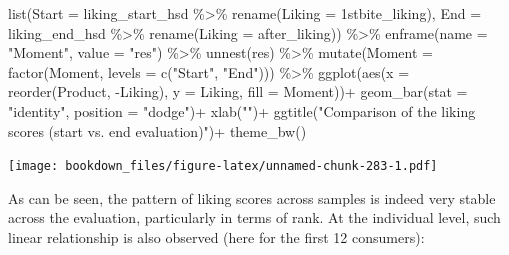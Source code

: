 \documentclass[
]{krantz}
\makeatletter
\newenvironment{Shaded}{\begin{snugshade}}{\end{snugshade}}
\newcommand{\AttributeTok}[1]{\textcolor[rgb]{0.61,0.61,0.61}{#1}}
\newcommand{\FunctionTok}[1]{\textcolor[rgb]{0,0,0}{#1}}
\newcommand{\NormalTok}[1]{#1}
\newcommand{\SpecialCharTok}[1]{\textcolor[rgb]{0,0,0}{#1}}
\newcommand{\StringTok}[1]{\textcolor[rgb]{0.5,0.5,0.5}{#1}}
\newenvironment{kframe}{%
\medskip{}
\setlength{\fboxsep}{.8em}
 \def\at@end@of@kframe{}%
 \ifinner\ifhmode%
  \def\at@end@of@kframe{\end{minipage}}%
  \begin{minipage}{\columnwidth}%
 \fi\fi%
 \def\FrameCommand##1{\hskip\@totalleftmargin \hskip-\fboxsep
 \colorbox{shadecolor}{##1}\hskip-\fboxsep
     \hskip-\linewidth \hskip-\@totalleftmargin \hskip\columnwidth}%
 \MakeFramed {\advance\hsize-\width
   \@totalleftmargin\z@ \linewidth\hsize
   \@setminipage}}%
 {\par\unskip\endMakeFramed%
 \at@end@of@kframe}
\renewenvironment{Shaded}{\begin{kframe}}{\end{kframe}}
\makeatother
\begin{document}
\begin{Shaded}
\begin{Highlighting}[]
\FunctionTok{list}\NormalTok{(}\AttributeTok{Start =}\NormalTok{ liking\_start\_hsd }\SpecialCharTok{\%\textgreater{}\%} \FunctionTok{rename}\NormalTok{(}\AttributeTok{Liking =} \StringTok{\textasciigrave{}}\AttributeTok{1stbite\_liking}\StringTok{\textasciigrave{}}\NormalTok{),}
     \AttributeTok{End =}\NormalTok{ liking\_end\_hsd }\SpecialCharTok{\%\textgreater{}\%} \FunctionTok{rename}\NormalTok{(}\AttributeTok{Liking =} \StringTok{\textasciigrave{}}\AttributeTok{after\_liking}\StringTok{\textasciigrave{}}\NormalTok{)) }\SpecialCharTok{\%\textgreater{}\%}
  \FunctionTok{enframe}\NormalTok{(}\AttributeTok{name =} \StringTok{"Moment"}\NormalTok{, }\AttributeTok{value =} \StringTok{"res"}\NormalTok{) }\SpecialCharTok{\%\textgreater{}\%}
  \FunctionTok{unnest}\NormalTok{(res) }\SpecialCharTok{\%\textgreater{}\%}
  \FunctionTok{mutate}\NormalTok{(}\AttributeTok{Moment =} \FunctionTok{factor}\NormalTok{(Moment, }\AttributeTok{levels =} \FunctionTok{c}\NormalTok{(}\StringTok{"Start"}\NormalTok{, }\StringTok{"End"}\NormalTok{))) }\SpecialCharTok{\%\textgreater{}\%}
  \FunctionTok{ggplot}\NormalTok{(}\FunctionTok{aes}\NormalTok{(}\AttributeTok{x =} \FunctionTok{reorder}\NormalTok{(Product, }\SpecialCharTok{{-}}\NormalTok{Liking), }\AttributeTok{y =}\NormalTok{ Liking, }\AttributeTok{fill =}\NormalTok{ Moment))}\SpecialCharTok{+}
  \FunctionTok{geom\_bar}\NormalTok{(}\AttributeTok{stat =} \StringTok{"identity"}\NormalTok{, }\AttributeTok{position =} \StringTok{"dodge"}\NormalTok{)}\SpecialCharTok{+}
  \FunctionTok{xlab}\NormalTok{(}\StringTok{""}\NormalTok{)}\SpecialCharTok{+}
  \FunctionTok{ggtitle}\NormalTok{(}\StringTok{"Comparison of the liking scores (start vs. end evaluation)"}\NormalTok{)}\SpecialCharTok{+}
  \FunctionTok{theme\_bw}\NormalTok{()}
\end{Highlighting}
\end{Shaded}

\texttt{[image: bookdown\_files/figure-latex/unnamed-chunk-283-1.pdf]}

As can be seen, the pattern of liking scores across samples is indeed very stable across the evaluation, particularly in terms of rank. At the individual level, such linear relationship is also observed (here for the first 12 consumers):
\end{document}
